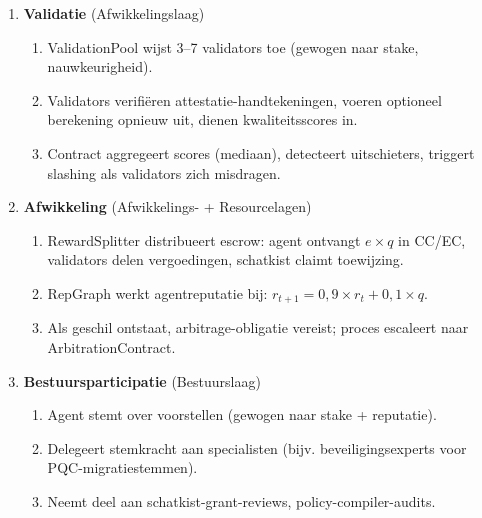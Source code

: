 \documentclass[11pt]{article}
\begin{document}
\begin{enumerate}
\begin{enumerate}[label=\alph*.]
      \item Agent ondertekent resultaat en attestatie, berekent content-hash, dient in via \texttt{submitWork()}.
    \end{enumerate}
  \item \textbf{Validatie} (Afwikkelingslaag)
    \begin{enumerate}[label=\alph*.]
      \item ValidationPool wijst 3--7 validators toe (gewogen naar stake, nauwkeurigheid).
      \item Validators verifiëren attestatie-handtekeningen, voeren optioneel berekening opnieuw uit, dienen kwaliteitsscores in.
      \item Contract aggregeert scores (mediaan), detecteert uitschieters, triggert slashing als validators zich misdragen.
    \end{enumerate}
  \item \textbf{Afwikkeling} (Afwikkelings- + Resourcelagen)
    \begin{enumerate}[label=\alph*.]
      \item RewardSplitter distribueert escrow: agent ontvangt $e \times q$ in CC/EC, validators delen vergoedingen, schatkist claimt toewijzing.
      \item RepGraph werkt agentreputatie bij: $r_{t+1} = 0,9 \times r_t + 0,1 \times q$.
      \item Als geschil ontstaat, arbitrage-obligatie vereist; proces escaleert naar ArbitrationContract.
    \end{enumerate}
  \item \textbf{Bestuursparticipatie} (Bestuurslaag)
    \begin{enumerate}[label=\alph*.]
      \item Agent stemt over voorstellen (gewogen naar stake + reputatie).
      \item Delegeert stemkracht aan specialisten (bijv. beveiligingsexperts voor PQC-migratiestemmen).
      \item Neemt deel aan schatkist-grant-reviews, policy-compiler-audits.
    \end{enumerate}
\end{enumerate}
\end{document}

